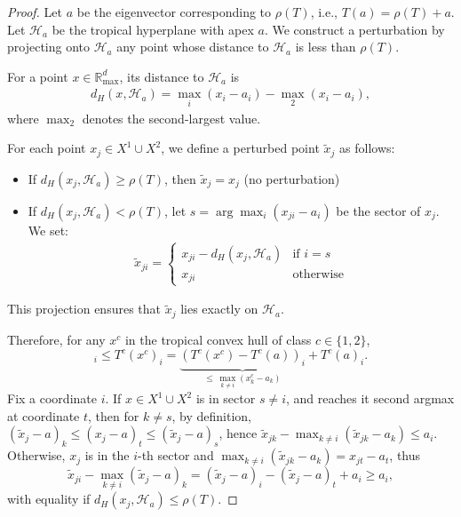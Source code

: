 \documentclass{article}
\newcommand{\Rmax}{\mathbb{R}_{\max}}
\begin{document}
\begin{proof}
Let $a$ be the eigenvector corresponding to $\rho(T)$, i.e., $T(a) = \rho(T) + a$. Let $\mathcal{H}_a$ be the tropical hyperplane with apex $a$. We construct a perturbation by projecting onto $\mathcal{H}_a$ any point whose distance to $\mathcal{H}_a$ is less than $\rho(T)$.

For a point $x \in \Rmax^d$, its distance to $\mathcal{H}_a$ is
\begin{align}
d_H(x, \mathcal{H}_a) = \max_i(x_i - a_i) - \max_2(x_i - a_i),
\end{align}
where $\max_2$ denotes the second-largest value.

For each point $x_j \in X^1 \cup X^2$, we define a perturbed point $\tilde{x}_j$ as follows:
\begin{itemize}
\item If $d_H(x_j, \mathcal{H}_a) \geq \rho(T)$, then $\tilde{x}_j = x_j$ (no perturbation)
\item If $d_H(x_j, \mathcal{H}_a) < \rho(T)$, let $s = \arg\max_i(x_{ji} - a_i)$ be the sector of $x_j$. We set:
  \begin{align}
  \tilde{x}_{ji} = \begin{cases}
  x_{ji} - d_H(x_j, \mathcal{H}_a) & \text{if } i = s \\
  x_{ji} & \text{otherwise}
  \end{cases}
  \end{align}
\end{itemize}

This projection ensures that $\tilde{x}_j$ lies exactly on $\mathcal{H}_a$.

Therefore, for any $x^{c}$ in the tropical convex hull of class $c\in\{1,2\}$,
\begin{equation}
[x^{c}]_{i}\le T^{c}(x^{c})_{i}=\underbrace{\left(T^{c}(x^{c})-T^{c}(a)\right)_{i}}_{\le\,\max_{k\ne i}(x_{k}^{c}-a_{k})}+T^{c}(a)_{i}.\label{eq:major}
\end{equation}
Fix a coordinate $i$. If $x\in X^{1}\cup X^{2}$ is in sector $s\ne i$, and reaches it second argmax at coordinate $t$, then for $k\ne s$, by definition,
$(\tilde{x}_{j}-a)_{k}\le(x_{j}-a)_{t}\le(\tilde{x}_{j}-a)_{s}$,
hence $\tilde{x}_{jk}-\max_{k\ne i}(\tilde{x}_{jk}-a_{k})\le a_{i}$.
Otherwise, $x_{j}$ is in the $i$-th sector and $\max_{k\ne i}(\tilde{x}_{jk}-a_{k})=x_{jt}-a_{t}$,
thus
\[
\tilde{x}_{ji}-\max_{k\ne i}(\tilde{x}_{j}-a)_{k}=(\tilde{x}_{j}-a)_{i}-(\tilde{x}_{j}-a)_{t}+a_{i}\ge a_{i},
\]
with equality if $d_{H}\left(x_{j},\mathcal{H}_{a}\right)\le\rho(T)$.


\end{proof}
\end{document}

